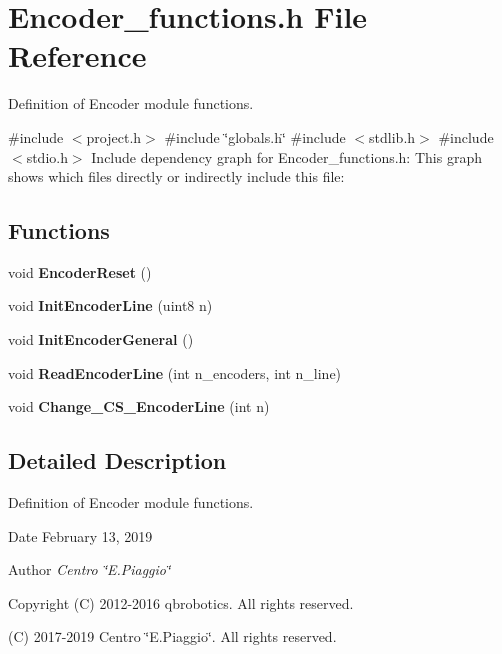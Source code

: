 \section{Encoder\+\_\+functions.\+h File Reference}
\label{_encoder__functions_8h}


Definition of Encoder module functions.  


{\ttfamily \#include $<$project.\+h$>$}\newline
{\ttfamily \#include \char`\"{}globals.\+h\char`\"{}}\newline
{\ttfamily \#include $<$stdlib.\+h$>$}\newline
{\ttfamily \#include $<$stdio.\+h$>$}\newline
Include dependency graph for Encoder\+\_\+functions.\+h\+:
This graph shows which files directly or indirectly include this file\+:
\subsection*{Functions}
\begin{DoxyCompactItemize}
\item 
\mbox{\label{_encoder__functions_8h_a1f711fe1ef258ba1b0d90cbce8a0e645}} 
void {\bfseries Encoder\+Reset} ()
\item 
\mbox{\label{_encoder__functions_8h_aa7dd2ab5bc6e906d2b1baa3dcf030197}} 
void {\bfseries Init\+Encoder\+Line} (uint8 n)
\item 
\mbox{\label{_encoder__functions_8h_a2ee4a1ed078be27aa04157f035933a2f}} 
void {\bfseries Init\+Encoder\+General} ()
\item 
\mbox{\label{_encoder__functions_8h_af23a5b3c809698c750feda90e24f85fe}} 
void {\bfseries Read\+Encoder\+Line} (int n\+\_\+encoders, int n\+\_\+line)
\item 
\mbox{\label{_encoder__functions_8h_a22b528bf1b9a7a0a86b618d7195b106b}} 
void {\bfseries Change\+\_\+\+C\+S\+\_\+\+Encoder\+Line} (int n)
\end{DoxyCompactItemize}


\subsection{Detailed Description}
Definition of Encoder module functions. 

\begin{DoxyDate}{Date}
February 13, 2019 
\end{DoxyDate}
\begin{DoxyAuthor}{Author}
{\itshape Centro \char`\"{}\+E.\+Piaggio\char`\"{}} 
\end{DoxyAuthor}
\begin{DoxyCopyright}{Copyright}
(C) 2012-\/2016 qbrobotics. All rights reserved. 

(C) 2017-\/2019 Centro \char`\"{}\+E.\+Piaggio\char`\"{}. All rights reserved. 
\end{DoxyCopyright}
